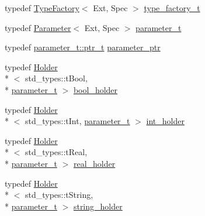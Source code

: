 \begin{DoxyCompactItemize}
\item 
typedef \hyperlink{classLIBKMS__namespace_1_1TypeFactory}{Type\-Factory}$<$ Ext, Spec $>$ \hyperlink{classLIBKMS__namespace_1_1TypeFactory_a1ea3eb75810d29bed5a7f017e188a43d}{type\-\_\-factory\-\_\-t}
\item 
typedef \hyperlink{classLIBKMS__namespace_1_1Parameter}{Parameter}$<$ Ext, Spec $>$ \hyperlink{classLIBKMS__namespace_1_1TypeFactory_a103a08b747cfe5b233b12c802b4563dc}{parameter\-\_\-t}
\item 
typedef \hyperlink{classLIBKMS__namespace_1_1Parameter_a28516bcd5bad5857b2d1c676e4176f51}{parameter\-\_\-t\-::ptr\-\_\-t} \hyperlink{classLIBKMS__namespace_1_1TypeFactory_a54c61c4d970a37a1059746070a1eea11}{parameter\-\_\-ptr}
\item 
typedef \hyperlink{classLIBKMS__namespace_1_1Holder}{Holder}\\*
$<$ std\-\_\-types\-::t\-Bool, \\*
\hyperlink{classLIBKMS__namespace_1_1TypeFactory_a103a08b747cfe5b233b12c802b4563dc}{parameter\-\_\-t} $>$ \hyperlink{classLIBKMS__namespace_1_1TypeFactory_a5af2bfe6425fe90d4951268240dc1768}{bool\-\_\-holder}
\item 
typedef \hyperlink{classLIBKMS__namespace_1_1Holder}{Holder}\\*
$<$ std\-\_\-types\-::t\-Int, \hyperlink{classLIBKMS__namespace_1_1TypeFactory_a103a08b747cfe5b233b12c802b4563dc}{parameter\-\_\-t} $>$ \hyperlink{classLIBKMS__namespace_1_1TypeFactory_a118a2227ad78008ae8e7d16c9d7f854a}{int\-\_\-holder}
\item 
typedef \hyperlink{classLIBKMS__namespace_1_1Holder}{Holder}\\*
$<$ std\-\_\-types\-::t\-Real, \\*
\hyperlink{classLIBKMS__namespace_1_1TypeFactory_a103a08b747cfe5b233b12c802b4563dc}{parameter\-\_\-t} $>$ \hyperlink{classLIBKMS__namespace_1_1TypeFactory_a789fcb94a8ce6dfd8b2ff0e9b4ce299c}{real\-\_\-holder}
\item 
typedef \hyperlink{classLIBKMS__namespace_1_1Holder}{Holder}\\*
$<$ std\-\_\-types\-::t\-String, \\*
\hyperlink{classLIBKMS__namespace_1_1TypeFactory_a103a08b747cfe5b233b12c802b4563dc}{parameter\-\_\-t} $>$ \hyperlink{classLIBKMS__namespace_1_1TypeFactory_a17b132ee9e501536bec342ed6377497a}{string\-\_\-holder}
\end{DoxyCompactItemize}
